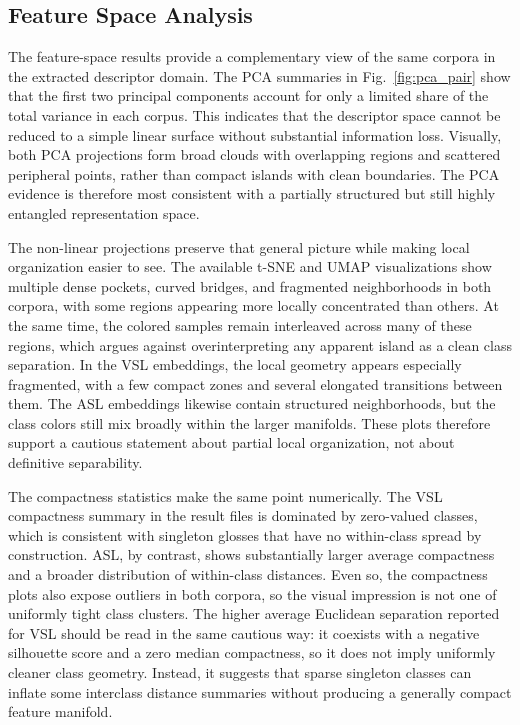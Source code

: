\documentclass{ieeeaccess}
\begin{document}
\subsection{Feature Space Analysis}
The feature-space results provide a complementary view of the same corpora in the extracted descriptor domain. The PCA summaries in Fig.~\ref{fig:pca_pair} show that the first two principal components account for only a limited share of the total variance in each corpus. This indicates that the descriptor space cannot be reduced to a simple linear surface without substantial information loss. Visually, both PCA projections form broad clouds with overlapping regions and scattered peripheral points, rather than compact islands with clean boundaries. The PCA evidence is therefore most consistent with a partially structured but still highly entangled representation space.

The non-linear projections preserve that general picture while making local organization easier to see. The available t-SNE and UMAP visualizations show multiple dense pockets, curved bridges, and fragmented neighborhoods in both corpora, with some regions appearing more locally concentrated than others. At the same time, the colored samples remain interleaved across many of these regions, which argues against overinterpreting any apparent island as a clean class separation. In the VSL embeddings, the local geometry appears especially fragmented, with a few compact zones and several elongated transitions between them. The ASL embeddings likewise contain structured neighborhoods, but the class colors still mix broadly within the larger manifolds. These plots therefore support a cautious statement about partial local organization, not about definitive separability.

The compactness statistics make the same point numerically. The VSL compactness summary in the result files is dominated by zero-valued classes, which is consistent with singleton glosses that have no within-class spread by construction. ASL, by contrast, shows substantially larger average compactness and a broader distribution of within-class distances. Even so, the compactness plots also expose outliers in both corpora, so the visual impression is not one of uniformly tight class clusters. The higher average Euclidean separation reported for VSL should be read in the same cautious way: it coexists with a negative silhouette score and a zero median compactness, so it does not imply uniformly cleaner class geometry. Instead, it suggests that sparse singleton classes can inflate some interclass distance summaries without producing a generally compact feature manifold.
\end{document}

